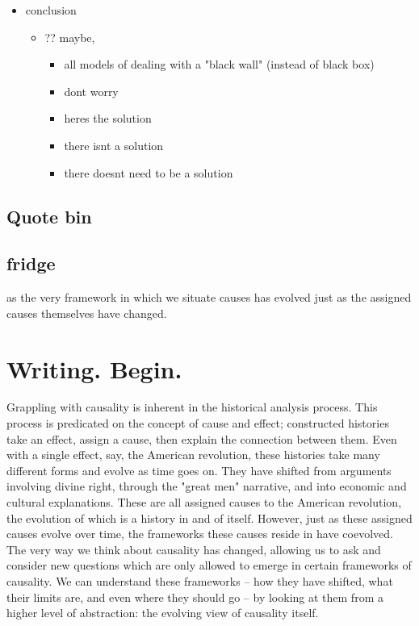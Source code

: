 \documentclass[letterpaper]{article}
\begin{document}
\begin{itemize}
\item conclusion

\begin{itemize}
\item ?? maybe,

\begin{itemize}
\item all models of dealing with a "black wall" (instead of black box)
\item dont worry
\item heres the solution
\item there isnt a solution
\item there doesnt need to be a solution
\end{itemize}
\end{itemize}
\end{itemize}

\subsection{Quote bin}
\label{sec:orgf4c84ab}
\subsection{fridge}
\label{sec:org80b0bef}
as the very framework in which we situate causes has evolved just as the
assigned causes themselves have changed.

\section{Writing. Begin.}
\label{sec:org55e95c2}
Grappling with causality is inherent in the historical analysis process.
This process is predicated on the concept of cause and effect;
constructed histories take an effect, assign a cause, then explain the
connection between them. Even with a single effect, say, the American
revolution, these histories take many different forms and evolve as time
goes on. They have shifted from arguments involving divine right,
through the "great men" narrative, and into economic and cultural
explanations. These are all assigned causes to the American revolution,
the evolution of which is a history in and of itself. However, just as
these assigned causes evolve over time, the frameworks these causes
reside in have coevolved. The very way we think about causality has
changed, allowing us to ask and consider new questions which are only
allowed to emerge in certain frameworks of causality. We can understand
these frameworks -- how they have shifted, what their limits are, and
even where they should go -- by looking at them from a higher level of
abstraction: the evolving view of causality itself.
\end{document}

